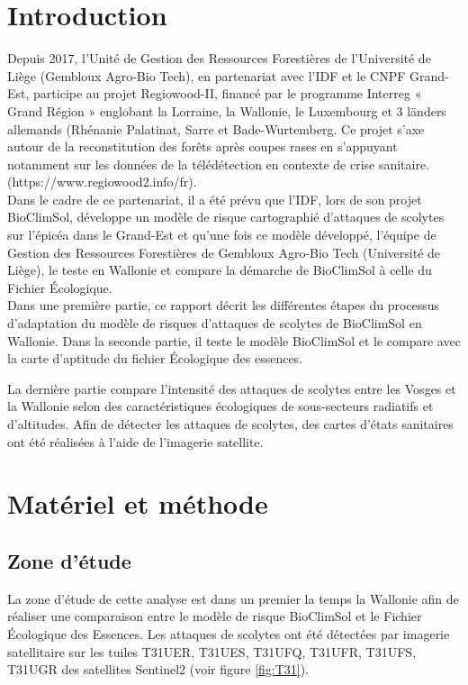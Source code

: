  \section{Introduction}

Depuis 2017, l’Unité de Gestion des Ressources Forestières de l’Université de Liège (Gembloux Agro-Bio Tech), en partenariat avec l’IDF et le CNPF Grand-Est, participe au projet Regiowood-II, financé par le programme Interreg « Grand Région » englobant la Lorraine, la Wallonie, le Luxembourg et 3 länders allemands (Rhénanie Palatinat, Sarre et Bade-Wurtemberg. 
Ce projet s’axe autour de la reconstitution des forêts après coupes rases en s’appuyant notamment sur les données de la télédétection en contexte de crise sanitaire. (https://www.regiowood2.info/fr).\\
Dans le cadre de ce partenariat, il a été prévu que l’IDF, lors de son projet BioClimSol, développe un modèle de risque cartographié d’attaques de scolytes sur l’épicéa dans le Grand-Est et qu'une fois ce modèle développé, l’équipe de Gestion des Ressources Forestières de  Gembloux Agro-Bio Tech (Université de Liège), le teste en Wallonie et compare la démarche de BioClimSol à celle du Fichier Écologique.\\
Dans une première partie, ce rapport décrit les différentes étapes du processus d'adaptation du modèle de risques d’attaques de scolytes de BioClimSol en Wallonie.
Dans la seconde partie, il  teste le modèle BioClimSol et le compare avec la carte d'aptitude du fichier Écologique des essences.

La dernière partie compare l'intensité des attaques de scolytes entre les Vosges et la Wallonie selon des caractéristiques écologiques de sous-secteurs radiatifs et d'altitudes. Afin de détecter les attaques de scolytes, des cartes d'états sanitaires ont été réalisées à l'aide de l'imagerie satellite.



 \section{Matériel et méthode}
 
 \subsection{Zone d'étude}
 
La zone d'étude de cette analyse est dans un premier la temps la Wallonie afin de réaliser une comparaison entre le modèle de risque BioClimSol et le Fichier Écologique des Essences. Les attaques de scolytes ont été détectées par imagerie satellitaire sur les tuiles T31UER, T31UES, T31UFQ, T31UFR, T31UFS, T31UGR des satellites Sentinel2 (voir figure \ref{fig:T31}).



